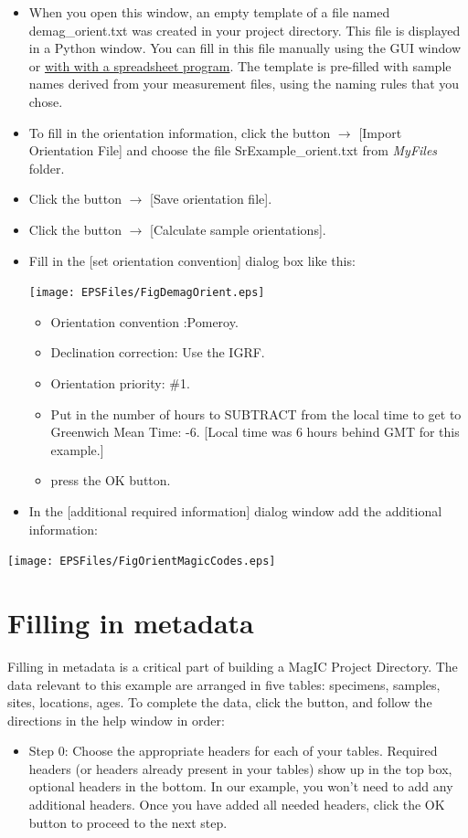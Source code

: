 \documentclass[11pt]{book}
\begin{document}
{\begin{itemize}
\item When you open this window, an empty template of a file named demag\_orient.txt was created in your project directory. This file is displayed in a Python window. You can fill in  this file manually using the GUI window or \href{#field_info}{with with a spreadsheet program}. The template is pre-filled with sample names derived from your measurement files, using the naming rules that you chose.
\item To fill in the orientation information, click the button $\rightarrow$ [Import Orientation File] and  choose the file SrExample\_orient.txt from {\it MyFiles} folder.
\item Click the button $\rightarrow$ [Save orientation file].
\item Click the button $\rightarrow$ [Calculate sample orientations].
\item Fill in the [set orientation convention] dialog box like this:

\texttt{[image: EPSFiles/FigDemagOrient.eps]}

\begin{itemize}
\item Orientation convention :Pomeroy.
\item Declination correction: Use the IGRF.
\item  Orientation priority: \#1.
\item Put in the number of hours to SUBTRACT from the local time to get to Greenwich Mean Time: -6. [Local time was 6 hours behind GMT for this example.]
\item press the OK button.
\end{itemize}
\item In the [additional required information] dialog window add the additional information:
\end{itemize}

\texttt{[image: EPSFiles/FigOrientMagicCodes.eps]}

\section{Filling in metadata}

Filling in metadata is a critical part of building a MagIC Project Directory. The data relevant to this example are arranged in five tables: specimens, samples, sites, locations, ages. To complete the data, click the button, and follow the directions in the help window in order:

\begin{itemize}
\item Step 0: Choose the appropriate headers for each of your tables.  Required headers (or headers already present in your tables) show up in the top box, optional headers in the bottom.  In our example, you won't need to add any additional headers.  Once you have added all needed headers, click the OK button to proceed to the next step.


\end{itemize}}
\end{document}
